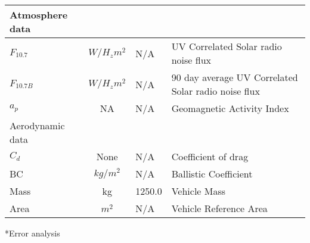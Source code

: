 \begin{table}[htb]
\begin{center}
{\begin{tabular}{|l|c|l|l|}
Atmosphere data   &            &          &      \\ \hline \hline
$F_{10.7}$        & $W/{H_z}{m^2}$    &   N/A    & UV Correlated Solar radio noise flux             \\ \hline
$F_{10.7B}$       & $W/{H_z}{m^2}$    &   N/A    &  90 day average UV Correlated Solar radio noise flux  \\ \hline
$a_p$            &  NA                &   N/A    &  Geomagnetic Activity Index                \\ \hline \hline
Aerodynamic data         &      &      &      \\ \hline \hline
$C_d$                    &None       &  N/A         & Coefficient of drag \\ \hline
BC                       &$kg/m^2$   &  N/A          & Ballistic Coefficient \\ \hline
Mass                     &kg         &  1250.0            & Vehicle Mass           \\ \hline
Area                     &$m^2$      &  N/A             & Vehicle Reference Area  \\ \hline
\end{tabular}}
\end{center}
\end{table}
*Error analysis \cite{JPL}
\clearpage
